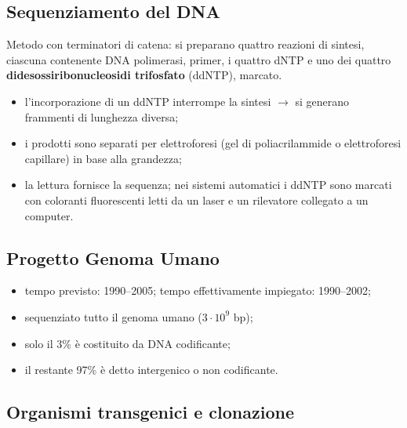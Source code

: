 \subsection{Sequenziamento del DNA}

Metodo con terminatori di catena: si preparano quattro reazioni di sintesi, ciascuna contenente DNA polimerasi, primer, i quattro dNTP e uno dei quattro \textbf{didesossiribonucleosidi trifosfato} (ddNTP), marcato.
\begin{itemize}
  \item l'incorporazione di un ddNTP interrompe la sintesi $\rightarrow$ si generano frammenti di lunghezza diversa;
  \item i prodotti sono separati per elettroforesi (gel di poliacrilammide o elettroforesi capillare) in base alla grandezza;
  \item la lettura fornisce la sequenza; nei sistemi automatici i ddNTP sono marcati con coloranti fluorescenti letti da un laser e un rilevatore collegato a un computer.
\end{itemize}

\subsection{Progetto Genoma Umano}

\begin{itemize}
  \item tempo previsto: 1990--2005; tempo effettivamente impiegato: 1990--2002;
  \item sequenziato tutto il genoma umano ($3 \cdot 10^9$ bp);
  \item solo il 3\% è costituito da DNA codificante;
  \item il restante 97\% è detto intergenico o non codificante.
\end{itemize}

\subsection{Organismi transgenici e clonazione}

